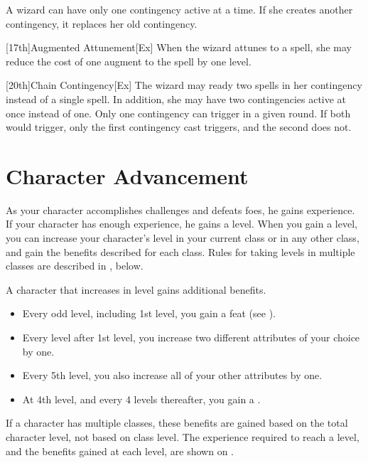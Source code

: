         A wizard can have only one contingency active at a time.
        If she creates another contingency, it replaces her old contingency.

        [17th]{Augmented Attunement}[Ex]
        When the wizard attunes to a spell, she may reduce the cost of one augment to the spell by one level.

        [20th]{Chain Contingency}[Ex]
        The wizard may ready two spells in her contingency instead of a single spell.
        In addition, she may have two contingencies active at once instead of one.
        Only one contingency can trigger in a given round.
        If both would trigger, only the first contingency cast triggers, and the second does not.

\section{Character Advancement}\label{Character Advancement}

    As your character accomplishes challenges and defeats foes, he gains experience.
    If your character has enough experience, he gains a level.
    When you gain a level, you can increase your character's level in your current class or in any other class, and gain the benefits described for each class.
    Rules for taking levels in multiple classes are described in , below.

    A character that increases in level gains additional benefits.
    \begin{itemize}
        \item Every odd level, including 1st level, you gain a feat (see ).
        \item Every level after 1st level, you increase two different attributes of your choice by one.
        \item Every 5th level, you also increase all of your other attributes by one.
        \item At 4th level, and every 4 levels thereafter, you gain a .
    \end{itemize}

    If a character has multiple classes, these benefits are gained based on the total character level, not based on class level.
    The experience required to reach a level, and the benefits gained at each level, are shown on .


